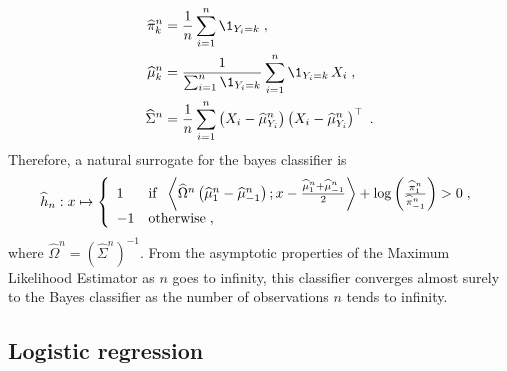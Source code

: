 \begin{align*}
\widehat \pi_k^n &= \frac{1}{n}\sum_{i=1}^n\1_{Y_i=k}\eqsp,\\
\widehat \mu_k^n &= \frac{1}{\sum_{i=1}^n\1_{Y_i=k}}\sum_{i=1}^n\1_{Y_i=k}\,X_i\eqsp,\\
\widehat\Sigma^n &= \frac{1}{n}\sum_{i=1}^n \left(X_i - \widehat \mu_{Y_i}^n\right)\left(X_i - \widehat \mu_{Y_i}^n\right)^\top\eqsp.
\end{align*}
Therefore, a natural surrogate for the bayes classifier is
\[
\widehat h_{n}: x\mapsto  \left\{
    \begin{array}{ll}
       1 & \mbox{if }\; \left\langle \widehat{\Omega}^n \left(\widehat\mu^n_1-\widehat\mu^n_{-1}\right);x - \frac{\widehat\mu^n_1  +\widehat\mu^n_{-1}}{2}\right\rangle + \log\left(\frac{\widehat\pi^n_{1}}{\widehat\pi^n_{-1}}\right)>0\;, \\
        -1 & \mbox{otherwise}\;,
    \end{array}
\right.
\]
where $\widehat{\Omega}^n = (\widehat\Sigma^n)^{-1}$. From the asymptotic properties of the Maximum Likelihood Estimator as $n$ goes to infinity, this  classifier converges almost surely to the Bayes classifier as the number of observations $n$ tends to infinity.




\subsection{Logistic regression}
\label{regression!logistic}

